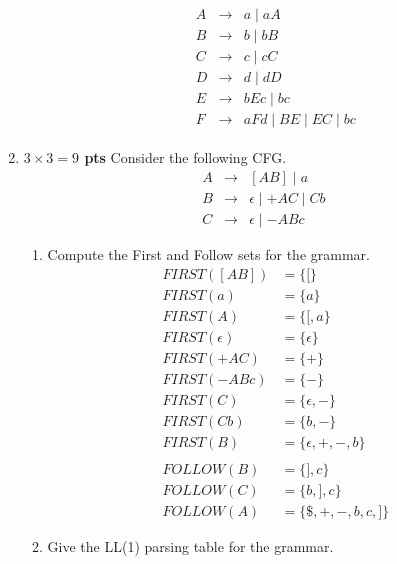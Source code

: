 \documentclass[10pt]{article}
\newcommand {\pts}[1]{{\bf #1 pts}}
\begin{document}
\begin{enumerate}
\begin{enumerate}
\[\begin{array}{cll}
\begin{array}{cll}
              A & \rightarrow & a \mid aA \\
              B & \rightarrow & b \mid bB \\
              C & \rightarrow & c \mid cC \\
              D & \rightarrow & d \mid dD \\
              E & \rightarrow & bEc \mid bc \\
              F & \rightarrow & aFd \mid BE \mid EC \mid bc
              \end{array}
              \end{array}
            \]
\end{enumerate}


   \newpage
\item \pts{$3\times 3= 9$} Consider the following CFG.
\[\begin{array}{cll}
A & \rightarrow & [AB] \mid a \\
B & \rightarrow & \epsilon \mid +AC \mid Cb \\
C & \rightarrow & \epsilon \mid -ABc
\end{array}\]
\begin{enumerate}
  \item Compute the First and Follow sets for the grammar.
      \begin{align*}
          FIRST([AB])     &= \{[\}                \\
          FIRST(a)        &= \{a\}                \\
          FIRST(A)        &= \{[, a\}             \\
          FIRST(\epsilon) &= \{\epsilon\}         \\
          FIRST(+AC)      &= \{+\}                \\
          FIRST(-ABc)     &= \{-\}                \\
          FIRST(C)        &= \{\epsilon, -\}      \\
          FIRST(Cb)       &= \{b, -\}             \\
          FIRST(B)        &= \{\epsilon, +, -, b\}\\
          \\
          FOLLOW(B)       &= \{],c\}              \\
          FOLLOW(C)       &= \{b,],c\}            \\
          FOLLOW(A)       &= \{\$,+,-,b,c,]\}
      \end{align*}
  \item Give the LL(1) parsing table for the grammar.

\end{enumerate}
\end{enumerate}
\end{document}

